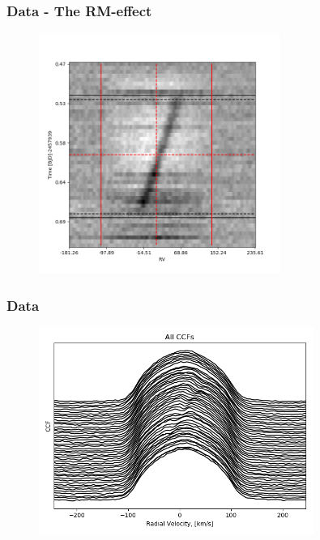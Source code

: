 \documentclass[show notes]{beamer}
\begin{document}
\begin{frame}
\frametitle{Data - The RM-effect}
	\begin{figure}
	\centering
	\includegraphics[width=0.7\textwidth]{../figures/Colormap.png}
	\label{fig:colormap}
\end{figure}
\end{frame}


\begin{frame}
\frametitle{Data}
	\begin{figure}
	\centering
	\includegraphics[width=0.8\textwidth]{../figures/All_CCFs.png}
	\label{fig:all_ccfs}
\end{figure}
\end{frame}
\end{document}
